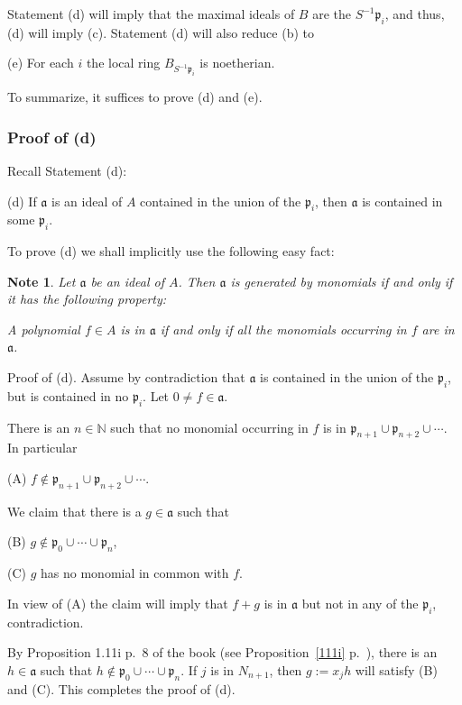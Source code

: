 \documentclass[parskip=half,fontsize=12pt]{scrartcl}%
\newcommand{\mf}{\mathfrak}
\newcommand{\aaa}{\mf a}
\newcommand{\ppp}{\mf p}
\newtheorem{note}[thm]{Note}
\begin{document}
Statement (d) will imply that the maximal ideals of $B$ are the $S^{-1}\ppp_i$, and thus, (d) will imply (c). Statement (d) will also reduce (b) to 

(e) For each $i$ the local ring $B_{S^{-1}\ppp_i}$ is noetherian.

To summarize, it suffices to prove (d) and (e). 

\subsubsection{Proof of (d)}

Recall Statement (d):

(d) If $\aaa$ is an ideal of $A$ contained in the union of the $\ppp_i$, then $\aaa$ is contained in some $\ppp_i$.

To prove (d) we shall implicitly use the following easy fact: 

\begin{note}\label{monid}
Let $\aaa$ be an ideal of $A$. Then $\aaa$ is generated by monomials if and only if it has the following property:

A polynomial $f\in A$ is in $\aaa$ if and only if all the monomials occurring in $f$ are in $\aaa$.
\end{note}

Proof of (d). Assume by contradiction that $\aaa$ is contained in the union of the $\ppp_i$, but is contained in no $\ppp_i$. Let $0\ne f\in\aaa$. 

There is an $n\in\mathbb N$ such that no monomial occurring in $f$ is in $\ppp_{n+1}\cup\ppp_{n+2}\cup\cdots$. In particular 

\qquad(A) $f\notin\ppp_{n+1}\cup\ppp_{n+2}\cup\cdots$. 

We claim that there is a $g\in\aaa$ such that 

\qquad(B) $g\notin\ppp_0\cup\cdots\cup\ppp_n$, 

\qquad(C) $g$ has no monomial in common with $f$.

In view of (A) the claim will imply that $f+g$ is in $\aaa$ but not in any of the $\ppp_i$, contradiction.
 
By Proposition 1.11i p.~8 of the book (see Proposition~\ref{111i} p.~\pageref{111i}), there is an $h\in\aaa$ such that $h\notin\ppp_0\cup\cdots\cup\ppp_n$. If $j$ is in $N_{n+1}$, then $g:=x_jh$ will satisfy (B) and (C). This completes the proof of (d).
\end{document}
